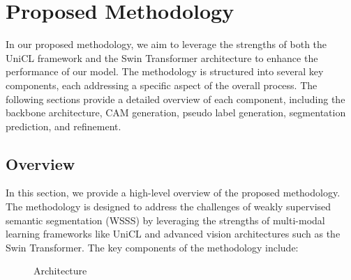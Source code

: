 \chapter{Proposed Methodology}
\label{chap:methodology}

In our proposed methodology, we aim to leverage the strengths of both the UniCL framework and the Swin Transformer architecture to enhance the performance of our model. The methodology is structured into several key components, each addressing a specific aspect of the overall process. The following sections provide a detailed overview of each component, including the backbone architecture, CAM generation, pseudo label generation, segmentation prediction, and refinement.

\section{Overview}
\label{sec:overview}
In this section, we provide a high-level overview of the proposed methodology. The methodology is designed to address the challenges of weakly supervised semantic segmentation (WSSS) by leveraging the strengths of multi-modal learning frameworks like UniCL and advanced vision architectures such as the Swin Transformer. The key components of the methodology include:

\begin{figure}
    \centering
    \caption{Architecture}
    \label{fig:architecture}
\end{figure}

